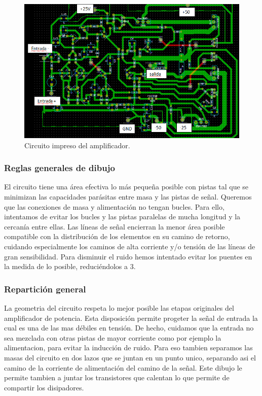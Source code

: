 \begin{figure}[H]
\centering
\includegraphics[scale=0.8]{img/eschema1.png}
\caption{Circuito impreso del amplificador.}
\end{figure}

\subsubsection*{Reglas generales de dibujo}
El circuito tiene una área efectiva lo más pequeña posible con pistas tal que se minimizan las capacidades parásitas entre masa y las pistas de señal.
Queremos que las conexiones de masa y alimentación no tengan bucles. Para ello, intentamos de evitar los bucles y las pistas paralelas de mucha longitud y la cercanía entre ellas.
Las líneas de señal encierran la menor área posible compatible con la distribución de los elementos en su camino de retorno, cuidando especialmente los caminos de alta corriente y/o tensión de las líneas de gran sensibilidad.
Para disminuir el ruido hemos intentado evitar los puentes en la medida de lo posible, reduciéndolos a 3.\\

\subsubsection*{Repartición general}
La geometria del circuito respeta lo mejor posible las etapas originales del amplificador de potencia.  Esta disposición permite progeter la señal de entrada la cual es una de las mas débiles en tensión. De hecho, cuidamos que la entrada no sea mezclada con otras pistas de mayor corriente como por ejemplo la alimentacion, para evitar la inducción de ruido. Para eso tambien separamos las masas del circuito en dos lazos que se juntan en un punto unico, separando asi el camino de la corriente de alimentación del camino de la señal.
Este dibujo le permite tambien a juntar los transistores que calentan lo que permite de compartir los disipadores.


